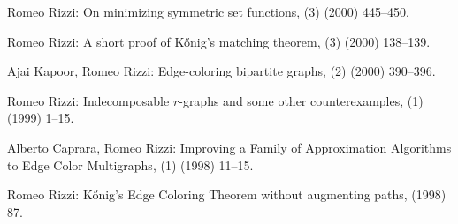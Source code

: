 \begin{etaremune}
  \item {\sc Romeo Rizzi:}
   \newblock  On minimizing symmetric set functions,
   (3) (2000) 445--450.

  \item {\sc Romeo Rizzi:}
   \newblock  A short proof of K\H{o}nig's matching theorem,
   (3) (2000) 138--139.

  \item {\sc Ajai Kapoor, Romeo Rizzi:}
   \newblock  Edge-coloring bipartite graphs,
   (2) (2000) 390--396.

  \item {\sc Romeo Rizzi:}
   \newblock  Indecomposable $r$-graphs and some other counterexamples,
   (1) (1999) 1--15.

  \item {\sc Alberto Caprara, Romeo Rizzi:}  
   \newblock  Improving a Family of Approximation
              Algorithms to Edge Color Multigraphs,
   (1) (1998) 11--15.

  \item {\sc Romeo Rizzi:}
   \newblock  K\H{o}nig's Edge Coloring Theorem without augmenting paths,
    (1998) 87.

\end{etaremune}
